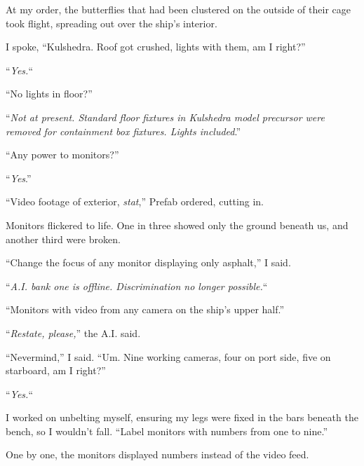 At my order, the butterflies that had been clustered on the outside of their cage took flight, spreading out over the ship's interior.



I spoke, ``Kulshedra.  Roof got crushed, lights with them, am I right?''



``\emph{Yes.}``



``No lights in floor?''



``\emph{Not at present.  Standard floor fixtures in Kulshedra model precursor were removed for containment box fixtures. Lights included}.''



``Any power to monitors?''



``\emph{Yes}.''



``Video footage of exterior, \emph{stat},'' Prefab ordered, cutting in.



Monitors flickered to life.  One in three showed only the ground beneath us, and another third were broken.



``Change the focus of any monitor displaying only asphalt,'' I said.



``\emph{A.I. bank one is offline.  Discrimination no longer possible.}``



``Monitors with video from any camera on the ship's upper half.''



``\emph{Restate, please,}'' the A.I. said.



``Nevermind,'' I said.  ``Um.  Nine working cameras, four on port side, five on starboard, am I right?''



``\emph{Yes.}``



I worked on unbelting myself, ensuring my legs were fixed in the bars beneath the bench, so I wouldn't fall.  ``Label monitors with numbers from one to nine.''



One by one, the monitors displayed numbers instead of the video feed.




